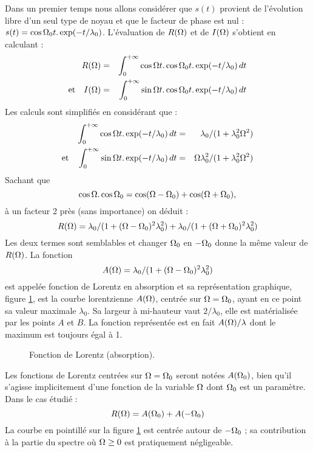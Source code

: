Dans un premier temps nous allons considérer que $s(t)$ provient de l'évolution libre d'un 
seul type de noyau et que le facteur de phase est nul : 
$s(t) = \cos \Omega_0 t . \exp(-t/\lambda_0)$. 
L'évaluation de $R(\Omega)$ et de $I(\Omega)$ s'obtient en calculant :
\begin{eqnarray}
R(\Omega) & = & \int_0^{+\infty}  \cos\Omega t . \cos \Omega_0 t . \exp(-t/\lambda_0) \, dt \\
\mbox{et}\quad	
I(\Omega) & = & \int_0^{+\infty}  \sin\Omega t . \cos \Omega_0 t . \exp(-t/\lambda_0) \, dt
\end{eqnarray}
Les calculs sont simplifiés en considérant que :
\begin{eqnarray}
\int_0^{+\infty} \cos \Omega t . \exp(-t/\lambda_0) \, dt & = & \lambda_0/(1 + \lambda_0^2 \Omega^2) \\
\mbox{et}\quad
\int_0^{+\infty} \sin \Omega t . \exp(-t/\lambda_0) \, dt & = & \Omega\lambda_0^2/(1 + \lambda_0^2 \Omega^2)
\end{eqnarray}
Sachant que
\begin{equation}
\cos \Omega . \cos \Omega_0 = \cos(\Omega - \Omega_0) + \cos(\Omega + \Omega_0), 
\end{equation}
à un facteur 2 près (sans importance) on déduit :
\begin{equation}
R(\Omega) = \lambda_0/(1 + (\Omega - \Omega_0)^2\lambda_0^2) + 
\lambda_0/(1 + (\Omega + \Omega_0)^2\lambda_0^2)
\end{equation}
Les deux termes sont semblables et changer $\Omega_0$ en $-\Omega_0$ 
donne la même valeur de $R(\Omega)$. 
La fonction
\begin{equation}
A(\Omega) = \lambda_0/(1 + (\Omega - \Omega_0)^2\lambda_0^2)
\end{equation}
est appelée fonction de Lorentz  en absorption et sa représentation graphique, figure \ref{fig:absorp}, 
est la courbe lorentzienne $A(\Omega)$, centrée sur $\Omega = \Omega_0$, ayant en ce point sa valeur maximale $\lambda_0$. 
Sa largeur à mi-hauteur vaut $2/\lambda_0$, elle est matérialisée par les points $A$ et $B$.
La fonction représentée est en fait $A(\Omega)/\lambda$ dont le maximum
est toujours égal à 1.

\begin{figure}[hbt]
\begin{center}
\end{center}
\caption{\label{fig:absorp}Fonction de Lorentz (absorption).}
\end{figure}

Les fonctions de Lorentz centrées sur 
$\Omega = \Omega_0$ seront notées $A(\Omega_0)$, 
bien qu'il s'agisse implicitement d'une fonction de la variable $\Omega$ 
dont $\Omega_0$ est un paramètre. 
Dans le cas étudié :
\begin{equation}
R(\Omega) = A(\Omega_0) + A(-\Omega_0)
\end{equation}
La courbe en pointillé sur la figure \ref{fig:absorp} est centrée autour
de $-\Omega_0$ ; sa contribution à la partie du spectre où $\Omega \ge 0$ est pratiquement
négligeable.

